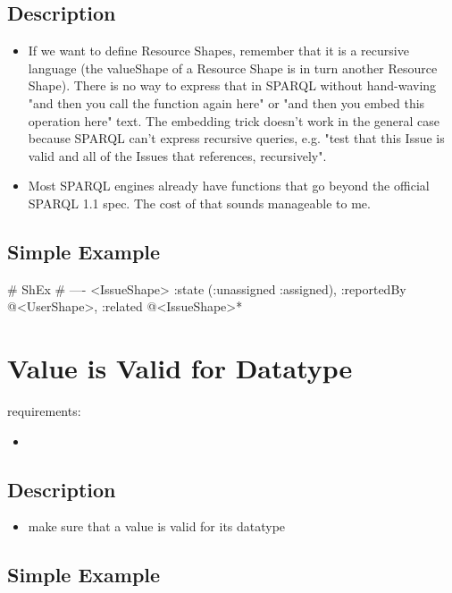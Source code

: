 \documentclass{llncs}
\begin{document}
\subsection{Description}

\begin{itemize}
	\item If we want to define Resource Shapes, remember that it is a recursive
language (the valueShape of a Resource Shape is in turn another
Resource Shape). There is no way to express that in SPARQL without
hand-waving "and then you call the function again here" or "and then
you embed this operation here" text.  The embedding trick doesn't work
in the general case because SPARQL can't express recursive queries,
e.g. "test that this Issue is valid and all of the Issues that
references, recursively".
  \item Most SPARQL engines already have
functions that go beyond the official SPARQL 1.1 spec. The cost of that
sounds manageable to me.
\end{itemize}

\subsection{Simple Example}

\begin{ex}
# ShEx
# ----
<IssueShape> {
    :state (:unassigned :assigned),
    :reportedBy @<UserShape>,
    :related @<IssueShape>*
}
\end{ex}

\section{Value is Valid for Datatype}

requirements:

\begin{itemize}
	\item 
\end{itemize}

\subsection{Description}

\begin{itemize}
	\item make sure that a value is valid for its datatype
\end{itemize}

\subsection{Simple Example}
\end{document}
